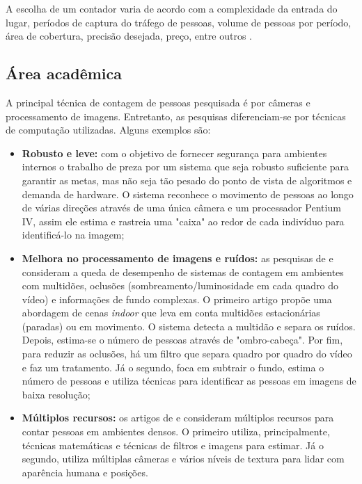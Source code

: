 A escolha de um contador varia de acordo com a complexidade da entrada do lugar, períodos de captura do tráfego de pessoas,
volume de pessoas por período, área de cobertura, precisão desejada, preço, entre outros \cite{trafsys} \cite{Axper2017}.

\subsection{Área acadêmica}
A principal técnica de contagem de pessoas pesquisada é por câmeras e processamento de imagens. Entretanto,
as pesquisas diferenciam-se por técnicas de computação utilizadas. Alguns exemplos são:

\begin{itemize}

  \item \textbf{Robusto e leve:} com o objetivo de fornecer segurança para ambientes internos
  o trabalho de  preza por um sistema que seja robusto suficiente para garantir as metas, mas
  não seja tão pesado do ponto de vista de algoritmos e demanda de hardware. O sistema reconhece o movimento de pessoas
  ao longo de várias direções através de uma única câmera e um processador Pentium IV, assim ele estima e rastreia uma "caixa" ao redor de cada indivíduo
  para identificá-lo na imagem;

  \item \textbf{Melhora no processamento de imagens e ruídos:} as pesquisas de  e  consideram
  a queda de desempenho de sistemas de contagem em ambientes com multidões, oclusões (sombreamento/luminosidade
  em cada quadro do vídeo) e informações de fundo complexas. O primeiro artigo propõe uma abordagem de cenas \emph{indoor}
  que leva em conta multidões estacionárias (paradas) ou em movimento. O sistema detecta a multidão e separa
  os ruídos. Depois, estima-se o número de pessoas através de "ombro-cabeça". Por fim, para reduzir as oclusões,
  há um filtro que separa quadro por quadro do vídeo e faz um tratamento. Já o segundo, foca em subtrair o fundo, estima
  o número de pessoas e utiliza técnicas para identificar as pessoas em imagens de baixa resolução;

  \item \textbf{Múltiplos recursos:} os artigos de  e  consideram múltiplos recursos para contar pessoas
  em ambientes densos. O primeiro utiliza, principalmente, técnicas matemáticas e técnicas de filtros e imagens para estimar. Já o segundo, utiliza
  múltiplas câmeras e vários níveis de textura para lidar com aparência humana e posições.

\end{itemize}

